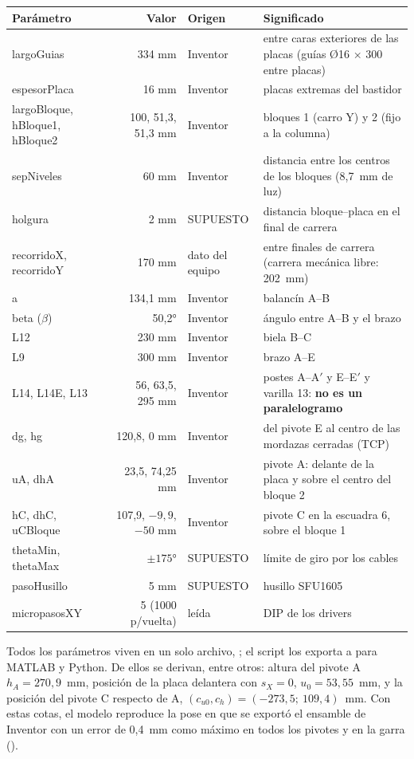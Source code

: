 \begin{center}\small
\begin{longtable}{>{\ttfamily}p{2.6cm} r >{\raggedright}p{2cm} >{\raggedright\arraybackslash}p{8cm}}
\toprule
\textbf{\rmfamily Parámetro} & \textbf{Valor} & \textbf{Origen} & \textbf{Significado}\\
\midrule
\endhead
largoGuias & 334 mm & Inventor & entre caras exteriores de las placas (guías Ø16 × 300 entre placas)\\
espesorPlaca & 16 mm & Inventor & placas extremas del bastidor\\
largoBloque, hBloque1, hBloque2 & 100, 51,3, 51,3 mm & Inventor & bloques 1 (carro Y) y 2 (fijo a la columna)\\
sepNiveles & 60 mm & Inventor & distancia entre los centros de los bloques (8,7~mm de luz)\\
holgura & 2 mm & SUPUESTO & distancia bloque--placa en el final de carrera\\
recorridoX, recorridoY & 170 mm & dato del equipo & entre finales de carrera (carrera mecánica libre: 202~mm)\\
a & 134,1 mm & Inventor & balancín A--B\\
beta ($\beta$) & 50,2° & Inventor & ángulo entre A--B y el brazo\\
L12 & 230 mm & Inventor & biela B--C\\
L9 & 300 mm & Inventor & brazo A--E\\
L14, L14E, L13 & 56, 63,5, 295 mm & Inventor & postes A--A$'$ y E--E$'$ y varilla 13: \textbf{no es un paralelogramo}\\
dg, hg & 120,8, 0 mm & Inventor & del pivote E al centro de las mordazas cerradas (TCP)\\
uA, dhA & 23,5, 74,25 mm & Inventor & pivote A: delante de la placa y sobre el centro del bloque 2\\
hC, dhC, uCBloque & 107,9, $-9{,}9$, $-50$ mm & Inventor & pivote C en la escuadra 6, sobre el bloque 1\\
thetaMin, thetaMax & $\pm175$° & SUPUESTO & límite de giro por los cables\\
pasoHusillo & 5 mm & SUPUESTO & husillo SFU1605\\
micropasosXY & 5 (1000 p/vuelta) & leída & DIP de los drivers\\
\bottomrule
\end{longtable}
\end{center}
Todos los parámetros viven en un solo archivo, ; el script  los exporta a  para MATLAB y Python. De ellos se derivan, entre otros: altura del pivote A $h_A = 270{,}9$~mm, posición de la placa delantera con $s_X = 0$, $u_0 = 53{,}55$~mm, y la posición del pivote C respecto de A, $(c_{u0}, c_h) = (-273{,}5;\ 109{,}4)$~mm. Con estas cotas, el modelo reproduce la pose en que se exportó el ensamble de Inventor con un error de 0,4~mm como máximo en todos los pivotes y en la garra ().

